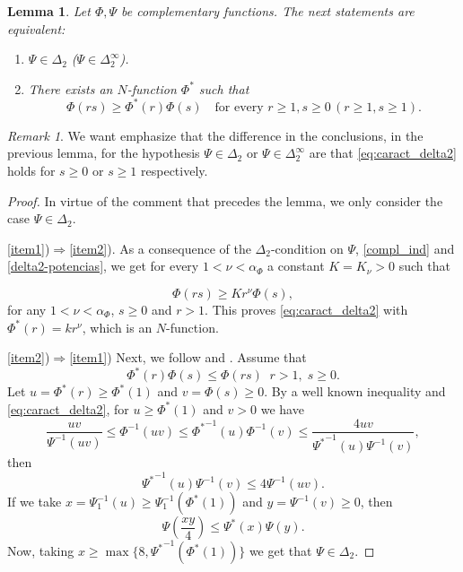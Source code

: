\documentclass[twoside]{article}
\newtheorem{lem}[thm]{Lemma}
\theoremstyle{remark}
\newtheorem{comentario}{Remark}
\renewcommand{\leq}{\leqslant}
\renewcommand{\geq}{\geqslant}
\begin{document}
\begin{lem}\label{lem:submultipliativa}
Let $\Phi,\Psi$ be complementary functions.
The next statements are equivalent:
\begin{enumerate}
\item\label{item1} $\Psi \in \Delta_2$ ($\Psi \in \Delta_2^{\infty}$).
\item\label{item2} There exists an $N$-function $\Phi^*$ such that
\begin{equation}\label{eq:caract_delta2}
\Phi(rs)\geq \Phi^*(r)\Phi(s)\quad\mbox{for every }r\geq1,s\geq 0\, (r\geq1,s\geq 1).
\end{equation}
\end{enumerate}
\end{lem}

\begin{comentario} We want emphasize that the difference in the conclusions, in the previous lemma, for the hypothesis $\Psi\in\Delta_2$ or $\Psi\in\Delta_2^{\infty}$ are that \eqref{eq:caract_delta2} holds for $s\geq 0$ or $s\geq 1$ respectively.

\end{comentario}


\begin{proof}
 In virtue of the comment that precedes the lemma, we only consider the case   $\Psi \in \Delta_2$.

\ref{item1})$\Rightarrow$\ref{item2}).
As a consequence of the $\Delta_2$-condition on $\Psi$, \eqref{compl_ind} and \eqref{delta2-potencias}, 
we get for every $1<\nu<\alpha_{\Phi}$ a constant $K=K_{\nu}>0$  such that

\begin{equation}\label{delta2-consecuencia}
\Phi(r s)\geq Kr^{\nu}\Phi(s),
\end{equation}
for any $1<\nu<\alpha_{\Phi}$,  $s\geq 0$ and $r>1$. This proves  \eqref{eq:caract_delta2} with $\Phi^*(r)=kr^\nu$, which is an $N$-function.

\ref{item2})$\Rightarrow$\ref{item1})
Next, we follow  \cite[p. 32, Prop. 13]{rao1991theory} and \cite[p. 29, Prop. 9]{rao1991theory}.
Assume that 
\[
\Phi^*(r)\Phi(s)\leq \Phi(rs)\;\;r>1,\;s\geq 0.
\]
Let $u=\Phi^*(r)\geq \Phi^*(1)$ and $v=\Phi(s)\geq 0$. By a well known inequality \cite[p. 13, Prop. 1]{rao1991theory} and \eqref{eq:caract_delta2},   for $u\geq \Phi^*(1)$ and $v> 0$ we have 
\[
\frac{uv}{\Psi^{-1}(uv)}\leq \Phi^{-1}(uv)\leq{\Phi^*}^{-1}(u)\Phi^{-1}(v)\leq
\frac{4uv}{{\Psi^*}^{-1}(u)\Psi^{-1}(v)},
\]
then 
\[
{\Psi^*}^{-1}(u)\Psi^{-1}(v)\leq 4 \Psi^{-1}(uv).
\]
If we take $x=\Psi^{-1}_1(u)\geq \Psi^{-1}_1(\Phi^*(1))$ and $y=\Psi^{-1}(v)\geq 0$, then 
\[
\Psi\left(\frac{xy}{4}\right)\leq \Psi^*(x)\Psi(y).
\]
Now, taking  $x\geq \max\{8,{\Psi^*}^{-1}(\Phi^*(1))\}$ we get that $\Psi \in \Delta_2$.
\end{proof}
\end{document}
